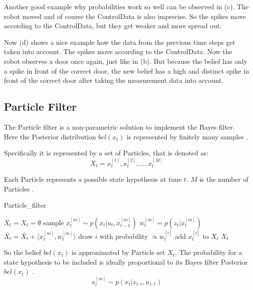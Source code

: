 Another good example why probabilities work so well can be observed in (c). The robot moved and of course the \gls{ControlData} is also imprecise. So the spikes move according to the \gls{ControlData}, but they get weaker and more spread out.

Now (d) shows a nice example how the data from the previous time steps get taken into account. The spikes move according to the \gls{ControlData}. Now the robot observes a door once again, just like in (b). But because the belief has only a spike in front of the correct door, the new belief has a high and distinct spike in front of the correct door after taking the measurement data into account.
\subsection{Particle Filter}
The \gls{Particle} filter is a non-parametric solution to implement the Bayes filter.  Here the \gls{Posterior} distribution $bel(x_t)$ is represented by finitely many samples \citep[p.\ 85]{Thrun:2005:PR:1121596}.

Specifically it is represented by a set of \gls{Particle}s, that is denoted as:
\begin{equation}
X_t = x_t^{[1]},x_t^{[2]},...,x_t^{[M]}
\end{equation}

Each \gls{Particle} represents a possible state hypothesis at time $t$. $M$ is the number of \gls{Particle}s \citep[p.\ 96-97]{Thrun:2005:PR:1121596}.

\begin{algorithm}
\caption{Particle\_filter \citep[p.\ 98]{Thrun:2005:PR:1121596}}
\label{particle_filter}
\begin{algorithmic}[1]
\State $\bar{X_t} = X_t = \emptyset$
\State sample $x_t^{[m]} \sim p(x_t|u_t,x_{t-1}^{[m]})$
\State $w_t^{[m]} = p(z_t|x_t^{[m]})$
\State $\bar{X_t} = \bar{X_t} + \langle x_t^{[m]},w_t^{[m]}\rangle$
\EndFor
{}
\State draw $i$ with probability $\propto w_t^{[i]}$
\State add $x_t^{[i]}$ to $X_t$
\EndFor
\State \Return $X_t$
\EndProcedure
\end{algorithmic}
\end{algorithm}

So the belief $bel(x_t)$ is approximated by \gls{Particle} set $X_t$. The probability for a state hypothesis to be included is ideally proportional to its Bayes filter \gls{Posterior} $bel(x_t)$ \citep[p.\ 98]{Thrun:2005:PR:1121596}.
\begin{equation} \label{eq:particle_prob}
x_t^{[m]} \sim p(x_t|z_{1:t},u_{1:t})
\end{equation}


